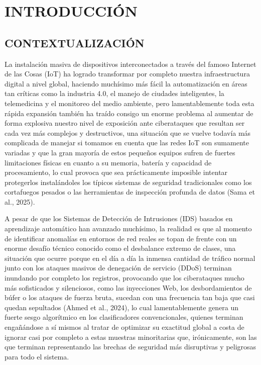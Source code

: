 \chapter{INTRODUCCIÓN}

\section{CONTEXTUALIZACIÓN}

La instalación masiva de dispositivos interconectados a través del famoso Internet de las Cosas (IoT) ha logrado transformar por completo nuestra infraestructura digital a nivel global, haciendo muchísimo más fácil la automatización en áreas tan críticas como la industria 4.0, el manejo de ciudades inteligentes, la telemedicina y el monitoreo del medio ambiente, pero lamentablemente toda esta rápida expansión también ha traído consigo un enorme problema al aumentar de forma explosiva nuestro nivel de exposición ante ciberataques que resultan ser cada vez más complejos y destructivos, una situación que se vuelve todavía más complicada de manejar si tomamos en cuenta que las redes IoT son sumamente variadas y que la gran mayoría de estos pequeños equipos sufren de fuertes limitaciones físicas en cuanto a su memoria, batería y capacidad de procesamiento, lo cual provoca que sea prácticamente imposible intentar protegerlos instalándoles los típicos sistemas de seguridad tradicionales como los cortafuegos pesados o las herramientas de inspección profunda de datos (Sama et al., 2025).

A pesar de que los Sistemas de Detección de Intrusiones (IDS) basados en aprendizaje automático han avanzado muchísimo, la realidad es que al momento de identificar anomalías en entornos de red reales se topan de frente con un enorme desafío técnico conocido como el desbalance extremo de clases, una situación que ocurre porque en el día a día la inmensa cantidad de tráfico normal junto con los ataques masivos de denegación de servicio (DDoS) terminan inundando por completo los registros, provocando que los ciberataques mucho más sofisticados y silenciosos, como las inyecciones Web, los desbordamientos de búfer o los ataques de fuerza bruta, sucedan con una frecuencia tan baja que casi quedan sepultados (Ahmed et al., 2024), lo cual lamentablemente genera un fuerte sesgo algorítmico en los clasificadores convencionales, quienes terminan engañándose a sí mismos al tratar de optimizar su exactitud global a costa de ignorar casi por completo a estas muestras minoritarias que, irónicamente, son las que terminan representando las brechas de seguridad más disruptivas y peligrosas para todo el sistema.

